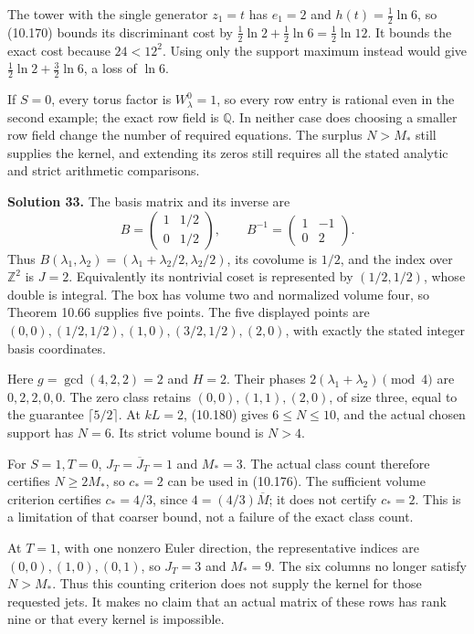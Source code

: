 \documentclass[
  11pt,
  a4paper,
]{article}
\begin{document}
The tower with the single generator \(z_1=t\) has \(e_1=2\) and
\(h(t)=\tfrac12\ln6\), so (10.170) bounds its discriminant cost by
\(\tfrac12\ln2+\tfrac12\ln6=\tfrac12\ln12\). It bounds the exact cost
because \(24<12^2\). Using only the support maximum instead would give
\(\tfrac12\ln2+\tfrac32\ln6\), a loss of \(\ln6\).

If \(S=0\), every torus factor is \(W_\lambda^0=1\), so every row entry
is rational even in the second example; the exact row field is
\(\mathbb Q\). In neither case does choosing a smaller row field change
the number of required equations. The surplus \(N>M_*\) still supplies
the kernel, and extending its zeros still requires all the stated
analytic and strict arithmetic comparisons.

\textbf{Solution 33.} The basis matrix and its inverse are \[
B=\begin{pmatrix}1&1/2\\0&1/2\end{pmatrix},\qquad
B^{-1}=\begin{pmatrix}1&-1\\0&2\end{pmatrix}.
\] Thus \(B(\lambda_1,\lambda_2)=(\lambda_1+\lambda_2/2,\lambda_2/2)\),
its covolume is \(1/2\), and the index over \(\mathbb Z^2\) is \(J=2\).
Equivalently its nontrivial coset is represented by \((1/2,1/2)\), whose
double is integral. The box has volume two and normalized volume four,
so Theorem 10.66 supplies five points. The five displayed points are
\((0,0),(1/2,1/2),(1,0),(3/2,1/2),(2,0)\), with exactly the stated
integer basis coordinates.

Here \(g=\gcd(4,2,2)=2\) and \(H=2\). Their phases
\(2(\lambda_1+\lambda_2)\pmod4\) are \(0,2,2,0,0\). The zero class
retains \((0,0),(1,1),(2,0)\), of size three, equal to the guarantee
\(\lceil5/2\rceil\). At \(kL=2\), (10.180) gives \(6\le N\le10\), and
the actual chosen support has \(N=6\). Its strict volume bound is
\(N>4\).

For \(S=1,T=0\), \(J_T=\overline J_T=1\) and \(M_*=3\). The actual class
count therefore certifies \(N\ge2M_*\), so \(c_*=2\) can be used in
(10.176). The sufficient volume criterion certifies \(c_*=4/3\), since
\(4=(4/3)\overline M\); it does not certify \(c_*=2\). This is a
limitation of that coarser bound, not a failure of the exact class
count.

At \(T=1\), with one nonzero Euler direction, the representative indices
are \((0,0),(1,0),(0,1)\), so \(J_T=3\) and \(M_*=9\). The six columns
no longer satisfy \(N>M_*\). Thus this counting criterion does not
supply the kernel for those requested jets. It makes no claim that an
actual matrix of these rows has rank nine or that every kernel is
impossible.
\end{document}
